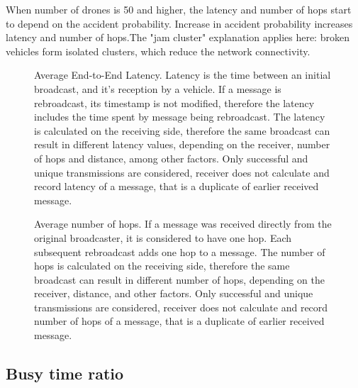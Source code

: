 \documentclass[]{nsm-thesis}
\begin{document}
When number of drones is 50 and higher, the latency and number of hops start to depend on the accident probability. Increase in accident probability increases latency and number of hops.The "jam cluster" explanation applies here: broken vehicles form isolated clusters, which reduce the network connectivity.

\begin{figure}%
	\centering
	\hfill
	\hfill
	\caption{Average End-to-End Latency. Latency is the time between an initial broadcast, and it's reception by a vehicle. If a message is rebroadcast, its timestamp is not modified, therefore the latency includes the time spent by message being rebroadcast. The latency is calculated on the receiving side, therefore the same broadcast can result in different latency values, depending on the receiver, number of hops and distance, among other factors. Only successful and unique transmissions are considered, receiver does not calculate and record latency of a message, that is a duplicate of earlier received message.}%
	\label{fig:Evaluation-Latency}%
\end{figure}

\begin{figure}%
	\centering
	\hfill
	\hfill
	\caption{Average number of hops. If a message was received directly from the original broadcaster, it is considered to have one hop. Each subsequent rebroadcast adds one hop to a message. The number of hops is calculated on the receiving side, therefore the same broadcast can result in different number of hops, depending on the receiver, distance, and other factors. Only successful and unique transmissions are considered, receiver does not calculate and record number of hops of a message, that is a duplicate of earlier received message.}%
	\label{fig:Evaluation-Latency}%
\end{figure}

\subsection{Busy time ratio}
\end{document}
